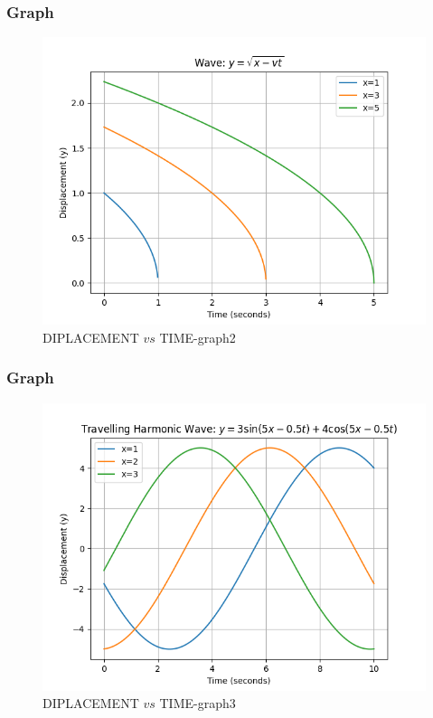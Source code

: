\documentclass{beamer}
\begin{document}
\begin{frame}
\frametitle{Graph}
\begin{figure}[ht]
                            \centering
                            \includegraphics[width=\columnwidth]{figs/b.png}
                            \caption{DIPLACEMENT $vs$ TIME-graph2}
                            \label{fig:2}
\end{figure}   
\end{frame}

\begin{frame}
\frametitle{Graph}
\begin{figure}[ht]
                             \centering
                             \includegraphics[width=\columnwidth]{figs/c.png}
                             \caption{DIPLACEMENT $vs$ TIME-graph3}
                             \label{fig:3}
\end{figure}
\end{frame}
\end{document}
